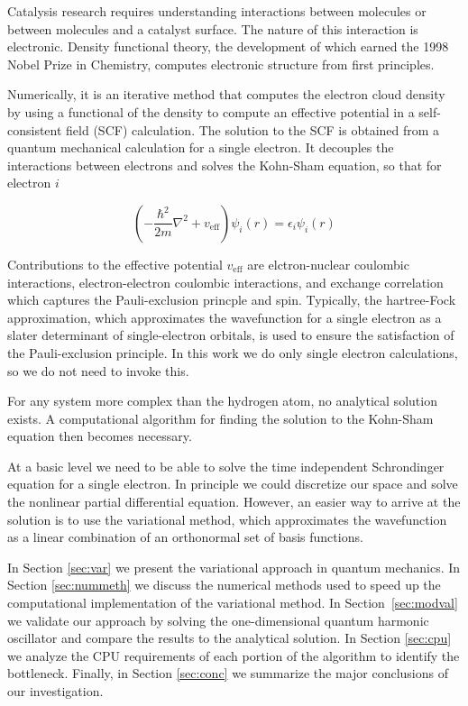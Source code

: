 \documentclass[12pt, a4paper, twocolumn]{article}
\begin{document}
Catalysis research requires understanding interactions between molecules or between molecules and a catalyst surface. The nature of this interaction is electronic. Density functional theory, the development of which earned the 1998 Nobel Prize in Chemistry, computes electronic structure from first principles. 

Numerically, it is an iterative method that computes the electron cloud density by using a functional of the density to compute an effective potential in a self-consistent field (SCF) calculation. The solution to the SCF is obtained from a quantum mechanical calculation for a single electron. It decouples the interactions between electrons and solves the Kohn-Sham equation, so that for electron $i$

\begin{equation}
\left( - \frac{\hbar ^2}{2m} \nabla ^2 + v_{\mathrm{eff}} \right) \psi_i (r) = \epsilon_i \psi_i (r)
\end{equation}
 
Contributions to the effective potential $v_{\mathrm{eff}}$ are elctron-nuclear coulombic interactions, electron-electron coulombic interactions, and exchange correlation which captures the Pauli-exclusion princple and spin. Typically, the hartree-Fock approximation, which approximates the wavefunction for a single electron as a slater determinant of single-electron orbitals, is used to ensure the satisfaction of the Pauli-exclusion principle. In this work we do only single electron calculations, so we do not need to invoke this. 

For any system more complex than the hydrogen atom, no analytical solution exists. A computational algorithm for finding the solution to the Kohn-Sham equation then becomes necessary. 

At a basic level we need to be able to solve the time independent Schrondinger equation for a single electron. In principle we could discretize our space and solve the nonlinear partial differential equation. However, an easier way to arrive at the solution is to use the variational method, which approximates the wavefunction as a linear combination of an orthonormal set of basis functions. 


In Section \ref{sec:var} we present the variational approach in quantum mechanics. In Section \ref{sec:nummeth} we discuss the numerical methods used to speed up the computational implementation of the variational method. In Section~\ref{sec:modval} we validate our approach by solving the one-dimensional quantum harmonic oscillator and compare the results to the analytical solution. In Section \ref{sec:cpu} we analyze the CPU requirements of each portion of the algorithm to identify the bottleneck. Finally, in Section \ref{sec:conc} we summarize the major conclusions of our investigation.
\end{document}
